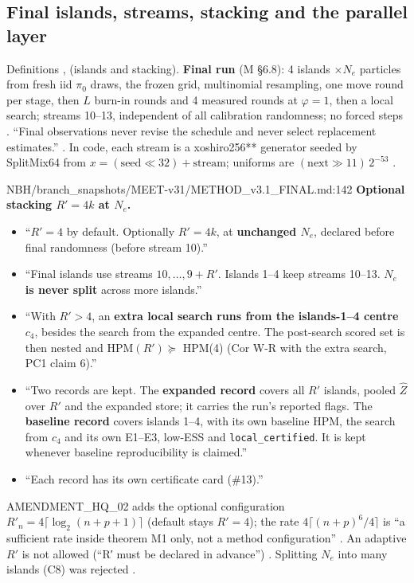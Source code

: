 \subsection{Final islands, streams, stacking and the parallel layer}\label{sec:method-islands}

Definitions ,  (islands and stacking). \textbf{Final run} (M \S6.8): 4 islands $\times N_e$ particles from
fresh iid $\pi_0$ draws, the frozen grid, multinomial resampling, one move round per stage, then $L$ burn-in rounds and 4
measured rounds at $\varphi=1$, then a local search; streams 10--13, independent of all calibration randomness; no forced
steps . ``Final observations never revise the schedule and never select
replacement estimates.'' . In code, each stream is a xoshiro256** generator
seeded by SplitMix64 from $x=(\mathrm{seed}\ll32)+\mathrm{stream}$; uniforms are $(\mathrm{next}\gg11)\,2^{-53}$
.

\begin{stmt}{NBH/branch_snapshots/MEET-v31/METHOD_v3.1_FINAL.md:142}
\textbf{Optional stacking $R'=4k$ at $N_e$.}
\begin{itemize}
\item ``$R'=4$ by default. Optionally $R'=4k$, at \textbf{unchanged $N_e$}, declared before final randomness (before stream 10).''
\item ``Final islands use streams $10,\dots,9+R'$. Islands 1--4 keep streams 10--13. \textbf{$N_e$ is never split} across more islands.''
\item ``With $R'>4$, an \textbf{extra local search runs from the islands-1--4 centre $c_4$}, besides the search from the expanded centre.
  The post-search scored set is then nested and HPM$(R')\succeq$ HPM(4) (Cor W-R with the extra search, PC1 claim 6).''
\item ``Two records are kept. The \textbf{expanded record} covers all $R'$ islands, pooled $\hat Z$ over $R'$ and the expanded store; it
  carries the run's reported flags. The \textbf{baseline record} covers islands 1--4, with its own baseline HPM, the search from $c_4$
  and its own E1--E3, low-ESS and \texttt{local\_certified}. It is kept whenever baseline reproducibility is claimed.''
\item ``Each record has its own certificate card (\#13).''
\end{itemize}
\end{stmt}
AMENDMENT\_HQ\_02 adds the optional configuration $R'_n=4\lceil\log_2(n+p+1)\rceil$ (default stays $R'=4$); the rate
$4\lceil(n+p)^6/4\rceil$ is ``a sufficient rate inside theorem M1 only, not a method configuration''
 .
An adaptive $R'$ is not allowed (``R′ must be declared in advance'') .
Splitting $N_e$ into many islands (C8) was rejected .


